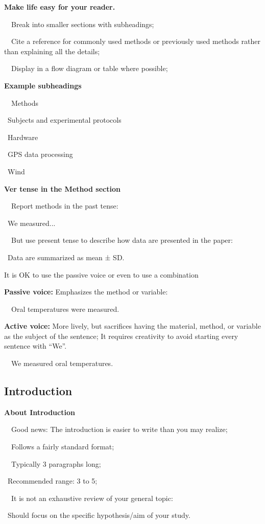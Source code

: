 \documentclass[a4paper, 12pt]{article}
\begin{document}
\textbf{Make life easy for your reader.}
\par\ \textbullet\ Break into smaller sections with subheadings;
\par\ \textbullet\ Cite a reference for commonly used methods or previously used methods rather than explaining all the details;
\par\ \textbullet\ Display in a flow diagram or table where possible;

\textbf{Example subheadings}
\par\ \textbullet\ Methods
\par\quad\textopenbullet\ Subjects and experimental protocols
\par\quad\textopenbullet\ Hardware
\par\quad\textopenbullet\ GPS data processing
\par\quad\textopenbullet\ Wind

\textbf{Ver tense in the Method section}
\par\ \textbullet\ Report methods in the past tense:
\par\quad\textopenbullet\ We measured...
\par\ \textbullet\ But use present tense to describe how data are presented in the paper:
\par\quad\textopenbullet\ Data are summarized as mean ± SD.

\newpage It is OK to use the passive voice or even to use a combination

\textbf{Passive voice:} Emphasizes the method or variable:
\par\ \textbullet\ Oral temperatures were measured.

\textbf{Active voice:} More lively, but sacrifices having the material, method, or variable as the subject of the sentence;
It requires creativity to avoid starting every sentence with ``We''.
\par\ \textbullet\ We measured oral temperatures.

\newpage\subsection{Introduction}

\textbf{About Introduction}
\par\ \textbullet\ Good news: The introduction is easier to write than you may realize;
\par\ \textbullet\ Follows a fairly standard format;
\par\ \textbullet\ Typically 3 paragraphs long;
\par\quad\textopenbullet\ Recommended range: 3 to 5;
\par\ \textbullet\ It is not an exhaustive review of your general topic:
\par\quad\textopenbullet\ Should focus on the specific hypothesis/aim of your study.
\end{document}
